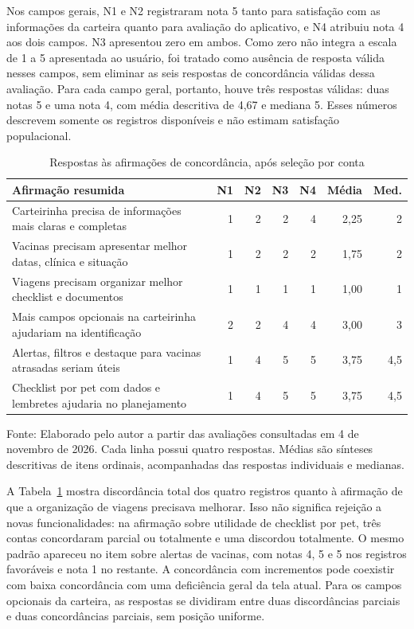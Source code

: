Nos campos gerais, N1 e N2 registraram nota 5 tanto para satisfação com as informações da carteira quanto para avaliação do aplicativo, e N4 atribuiu nota 4 aos dois campos. N3 apresentou zero em ambos. Como zero não integra a escala de 1 a 5 apresentada ao usuário, foi tratado como ausência de resposta válida nesses campos, sem eliminar as seis respostas de concordância válidas dessa avaliação. Para cada campo geral, portanto, houve três respostas válidas: duas notas 5 e uma nota 4, com média descritiva de 4,67 e mediana 5. Esses números descrevem somente os registros disponíveis e não estimam satisfação populacional.

\begin{table}[htbp]
\centering
\caption{Respostas às afirmações de concordância, após seleção por conta}
\label{tab:likert_novembro}
\small
\setlength{\tabcolsep}{4pt}
\renewcommand{\arraystretch}{1.15}
\begin{tabular}{@{}p{}rrrrrr@{}}
\hline
\textbf{Afirmação resumida} & \textbf{N1} & \textbf{N2} & \textbf{N3} & \textbf{N4} & \textbf{Média} & \textbf{Med.} \\
\hline
Carteirinha precisa de informações mais claras e completas & 1 & 2 & 2 & 4 & 2,25 & 2 \\
Vacinas precisam apresentar melhor datas, clínica e situação & 1 & 2 & 2 & 2 & 1,75 & 2 \\
Viagens precisam organizar melhor checklist e documentos & 1 & 1 & 1 & 1 & 1,00 & 1 \\
Mais campos opcionais na carteirinha ajudariam na identificação & 2 & 2 & 4 & 4 & 3,00 & 3 \\
Alertas, filtros e destaque para vacinas atrasadas seriam úteis & 1 & 4 & 5 & 5 & 3,75 & 4,5 \\
Checklist por pet com dados e lembretes ajudaria no planejamento & 1 & 4 & 5 & 5 & 3,75 & 4,5 \\
\hline
\end{tabular}
\par\vspace{2pt}
{\footnotesize\raggedright Fonte: Elaborado pelo autor a partir das avaliações consultadas em 4 de novembro de 2026. Cada linha possui quatro respostas. Médias são sínteses descritivas de itens ordinais, acompanhadas das respostas individuais e medianas.\par}
\end{table}

A Tabela~\ref{tab:likert_novembro} mostra discordância total dos quatro registros quanto à afirmação de que a organização de viagens precisava melhorar. Isso não significa rejeição a novas funcionalidades: na afirmação sobre utilidade de checklist por pet, três contas concordaram parcial ou totalmente e uma discordou totalmente. O mesmo padrão apareceu no item sobre alertas de vacinas, com notas 4, 5 e 5 nos registros favoráveis e nota 1 no restante. A concordância com incrementos pode coexistir com baixa concordância com uma deficiência geral da tela atual. Para os campos opcionais da carteira, as respostas se dividiram entre duas discordâncias parciais e duas concordâncias parciais, sem posição uniforme.

